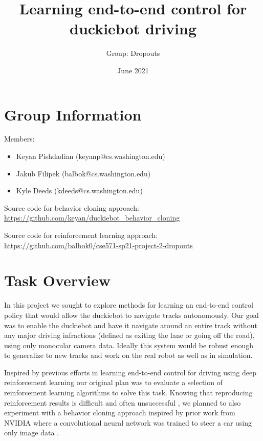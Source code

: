 \documentclass{article}
\title{Learning end-to-end control for duckiebot driving}
\author{Group: Dropouts}
\date{June 2021}
\begin{document}
\maketitle

\section{Group Information}

Members:
\begin{itemize}
    \item Keyan Pishdadian (keyanp@cs.washington.edu)
    \item Jakub Filipek (balbok@cs.washington.edu)
    \item Kyle Deeds (kdeeds@cs.washington.edu)
\end{itemize}

\noindent Source code for behavior cloning approach:
\newline
\url{https://github.com/keyan/duckiebot_behavior_cloning}

\noindent Source code for reinforcement learning approach:
\newline
\url{https://github.com/balbok0/cse571-sp21-project-2-dropouts}

\section{Task Overview}

In this project we sought to explore methods for learning an end-to-end control policy that would allow the duckiebot to navigate tracks autonomously. Our goal was to enable the duckiebot and have it navigate around an entire track without any major driving infractions (defined as exiting the lane or going off the road), using only monocular camera data. Ideally this system would be robust enough to generalize to new tracks and work on the real robot as well as in simulation.

Inspired by previous efforts in learning end-to-end control for driving using deep reinforcement learning \cite{DBLP:journals/corr/abs-1807-00412} our original plan was to evaluate a selection of reinforcement learning algorithms to solve this task. Knowing that reproducing reinforcement results is difficult and often unsuccessful \cite{henderson2019deep}, we planned to also experiment with a behavior cloning approach inspired by prior work from NVIDIA where a convolutional neural network was trained to steer a car using only image data \cite{DBLP:journals/corr/BojarskiTDFFGJM16}.
\end{document}
